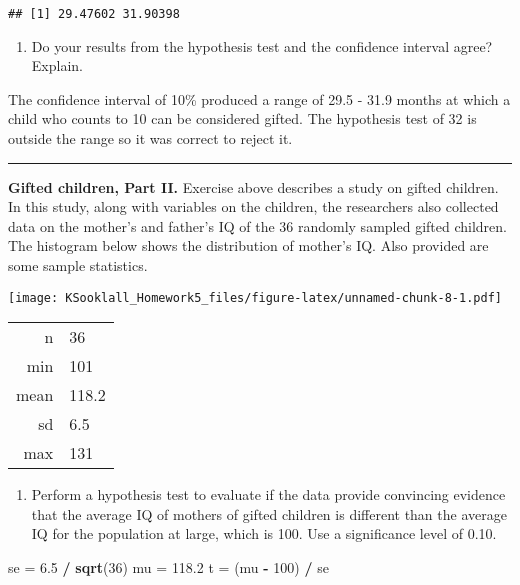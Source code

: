 \documentclass[
]{article}
\newenvironment{Shaded}{\begin{snugshade}}{\end{snugshade}}
\newcommand{\DecValTok}[1]{\textcolor[rgb]{0.00,0.00,0.81}{#1}}
\newcommand{\FloatTok}[1]{\textcolor[rgb]{0.00,0.00,0.81}{#1}}
\newcommand{\KeywordTok}[1]{\textcolor[rgb]{0.13,0.29,0.53}{\textbf{#1}}}
\newcommand{\NormalTok}[1]{#1}
\newcommand{\OperatorTok}[1]{\textcolor[rgb]{0.81,0.36,0.00}{\textbf{#1}}}
\newcommand{\StringTok}[1]{\textcolor[rgb]{0.31,0.60,0.02}{#1}}
\providecommand{\tightlist}{%
  \setlength{\itemsep}{0pt}\setlength{\parskip}{0pt}}
\begin{document}
\begin{verbatim}
## [1] 29.47602 31.90398
\end{verbatim}

\begin{enumerate}
\def\labelenumi{(\alph{enumi})}
\setcounter{enumi}{4}
\tightlist
\item
  Do your results from the hypothesis test and the confidence interval
  agree? Explain.
\end{enumerate}

The confidence interval of 10\% produced a range of 29.5 - 31.9 months
at which a child who counts to 10 can be considered gifted. The
hypothesis test of 32 is outside the range so it was correct to reject
it.

\begin{center}\rule{0.5\linewidth}{0.5pt}\end{center}

\clearpage

\textbf{Gifted children, Part II.} Exercise above describes a study on
gifted children. In this study, along with variables on the children,
the researchers also collected data on the mother's and father's IQ of
the 36 randomly sampled gifted children. The histogram below shows the
distribution of mother's IQ. Also provided are some sample statistics.

\texttt{[image: KSooklall\_Homework5\_files/figure-latex/unnamed-chunk-8-1.pdf]}

\begin{tabular}{r | l}
n   & 36 \\
min & 101 \\
mean    & 118.2 \\
sd  & 6.5 \\
max & 131 
\end{tabular}

\begin{enumerate}
\def\labelenumi{(\alph{enumi})}
\tightlist
\item
  Perform a hypothesis test to evaluate if the data provide convincing
  evidence that the average IQ of mothers of gifted children is
  different than the average IQ for the population at large, which is
  100. Use a significance level of 0.10.
\end{enumerate}

\begin{Shaded}
\begin{Highlighting}[]
\NormalTok{se =}\StringTok{ }\FloatTok{6.5} \OperatorTok{/}\StringTok{ }\KeywordTok{sqrt}\NormalTok{(}\DecValTok{36}\NormalTok{)}
\NormalTok{mu =}\StringTok{ }\FloatTok{118.2}
\NormalTok{t =}\StringTok{ }\NormalTok{(mu }\OperatorTok{-}\StringTok{ }\DecValTok{100}\NormalTok{) }\OperatorTok{/}\StringTok{ }\NormalTok{se}
\end{Highlighting}
\end{Shaded}
\end{document}
